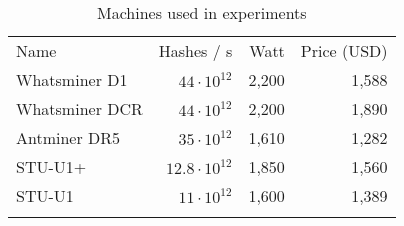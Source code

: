 \begin{longtable}{|p{}|r|r|r|}
  \hline
  Name & Hashes / s & Watt & Price (USD) \\
  \hhline{|=|=|=|=|}
  Whatsminer D1 & $44 \cdot 10^{12}$ & 2,200 & 1,588 \\
  Whatsminer DCR & $44 \cdot 10^{12}$ & 2,200 & 1,890 \\
  Antminer DR5 & $35 \cdot 10^{12}$ & 1,610 & 1,282 \\
  STU-U1+ & $12.8 \cdot 10^{12}$ & 1,850 & 1,560 \\
  STU-U1 & $11 \cdot 10^{12}$ & 1,600 & 1,389 \\
  \hline
\caption{Machines used in experiments}
\label{tbl:machines}
\end{longtable}
